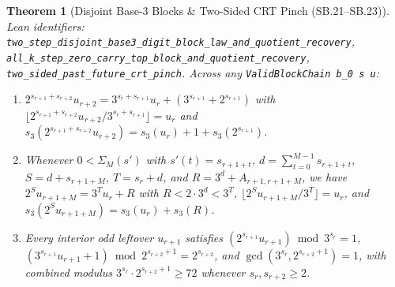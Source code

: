 \documentclass[11pt]{article}
\newtheorem{theorem}{Theorem}[section]
\begin{document}
\begin{theorem}[Disjoint Base-3 Blocks \& Two-Sided CRT Pinch (SB.21--SB.23)]
\emph{Lean identifiers:} \nolinkurl{two_step_disjoint_base3_digit_block_law_and_quotient_recovery}, \nolinkurl{all_k_step_zero_carry_top_block_and_quotient_recovery}, \nolinkurl{two_sided_past_future_crt_pinch}.
Across any \texttt{ValidBlockChain b\_0 s u}:
\begin{enumerate}
  \item $2^{s_{r+1}+s_{r+2}} u_{r+2} = 3^{s_r+s_{r+1}} u_r + (3^{s_{r+1}} + 2^{s_{r+1}})$ with $\lfloor 2^{s_{r+1}+s_{r+2}} u_{r+2} / 3^{s_r+s_{r+1}} \rfloor = u_r$ and $s_3(2^{s_{r+1}+s_{r+2}} u_{r+2}) = s_3(u_r) + 1 + s_3(2^{s_{r+1}})$.
  \item Whenever $0 < \Sigma_M(s')$ with $s'(t) = s_{r+1+t}$, $d = \sum_{t=0}^{M-1} s_{r+1+t}$, $S = d + s_{r+1+M}$, $T = s_r + d$, and $R = 3^d + A_{r+1, r+1+M}$, we have $2^S u_{r+1+M} = 3^T u_r + R$ with $R < 2 \cdot 3^d < 3^T$, $\lfloor 2^S u_{r+1+M} / 3^T \rfloor = u_r$, and $s_3(2^S u_{r+1+M}) = s_3(u_r) + s_3(R)$.
  \item Every interior odd leftover $u_{r+1}$ satisfies $(2^{s_{r+1}} u_{r+1}) \bmod 3^{s_r} = 1$, $(3^{s_{r+1}} u_{r+1} + 1) \bmod 2^{s_{r+2}+1} = 2^{s_{r+2}}$, and $\gcd(3^{s_r}, 2^{s_{r+2}+1}) = 1$, with combined modulus $3^{s_r} \cdot 2^{s_{r+2}+1} \ge 72$ whenever $s_r, s_{r+2} \ge 2$.
\end{enumerate}
\end{theorem}
\end{document}
